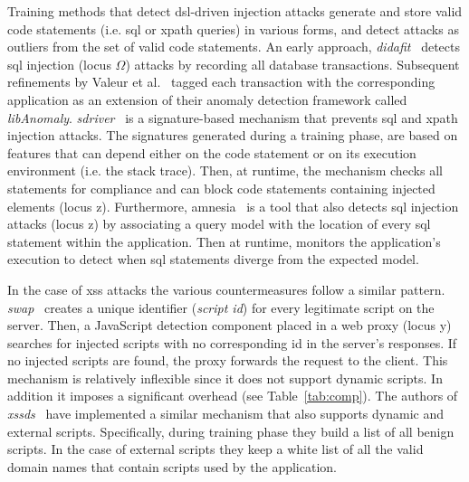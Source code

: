 \documentclass[conference]{IEEEtran}
\begin{document}
Training methods that detect {\sc dsl}-driven injection attacks
generate and store valid code statements (i.e. {\sc sql}
or {\sc xp}ath queries) in various forms, and detect attacks
as outliers from the set of valid code statements.
An early approach, {\it {\sc didafit}}~\cite{LLW02} detects
{\sc sql} injection (locus $\Omega$) attacks by recording all database transactions.
Subsequent refinements by Valeur et al.~\cite{VMV05}
tagged each transaction with the corresponding application
as an extension of their anomaly detection framework called
{\it libAnomaly}. {\it {\sc sd}river}~\cite{MS09,MKS09} is
a signature-based mechanism that prevents {\sc sql} and
{\sc xp}ath injection attacks. The signatures generated
during a training phase, are based on features that can
depend either on the code statement or on its execution
environment (i.e. the stack trace).
Then, at runtime, the mechanism checks all statements for compliance
and can block code statements containing injected elements (locus {\sc z}).
Furthermore, {\sc amnesia}~\cite{HO05,HO06,HO05b} is a tool
that also detects {\sc sql} injection attacks (locus {\sc z})
by associating a query model with the location of every
{\sc sql} statement within the application.
Then at runtime, monitors the application's execution to
detect when {\sc sql} statements diverge from the expected model.

In the case of {\sc xss} attacks the various countermeasures
follow a similar pattern. {\it {\sc swap}}~\cite{WPLKK09}
creates a unique identifier ({\it script {\sc id}}) for
every legitimate script on the server.
Then, a JavaScript detection component placed in a
web proxy (locus {\sc y}) searches for injected scripts
with no corresponding {\sc id} in the server's responses.
If no injected scripts are found, the proxy forwards the
request to the client. This mechanism is relatively
inflexible since it does not support dynamic scripts.
In addition it imposes a significant overhead (see Table~\ref{tab:comp}).
The authors of {\it {\sc xssds}}~\cite{JEP08}
have implemented a similar mechanism that also supports
dynamic and external scripts. Specifically,
during training phase they build a list of all benign scripts.
In the case of external scripts they keep a white list
of all the valid domain names that contain scripts
used by the application.
\end{document}
